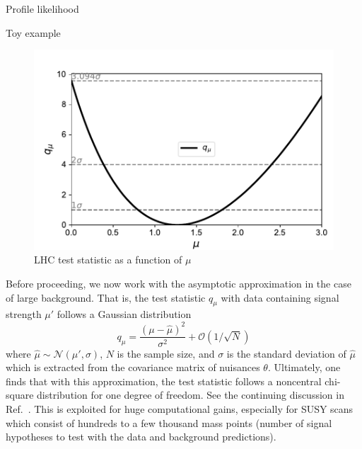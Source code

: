 \begin{section}{Profile likelihood}
\begin{subsection}{Toy example}
\begin{figure}[!htb]
    \centering
    \includegraphics[width=0.80\linewidth]{figs/toy_statistics/qmu_vs_mu.pdf}
    \caption{
LHC test statistic as a function of $\mu$
    }
    \label{fig:toystat:qmu}
\end{figure}

Before proceeding, we now work with the asymptotic approximation in the case of large
background. That is, the test statistic $q_\mu$ with data containing signal strength $\mu'$
follows a Gaussian distribution 
\begin{equation}
    q_\mu = \frac{(\mu-\hat{\mu})^2}{\sigma^2} + \mathcal{O}(1/\sqrt{N})
\end{equation}
where $\hat{\mu}\sim \mathcal{N}(\mu',\sigma)$, $N$ is the sample size,
and $\sigma$ is the standard deviation of $\hat{\mu}$ which is extracted
from the covariance matrix of nuisances $\theta$. Ultimately, one finds that
with this approximation, the test statistic follows a noncentral chi-square distribution
for one degree of freedom. See the continuing discussion in Ref.~\cite{STAT:Cowan2010js}. 
This is exploited for huge computational gains, especially for SUSY scans which consist
of hundreds to a few thousand mass points (number of signal hypotheses to test with the data 
and background predictions).


\end{subsection}
\end{section}
